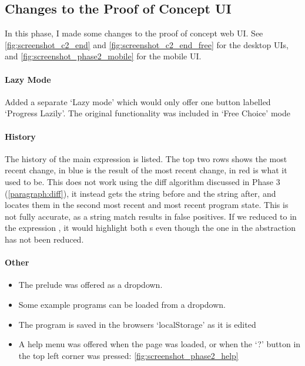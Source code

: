 \subsection{Changes to the Proof of Concept UI}
\label{c2_poc_ui_impl}
In this phase, I made some changes to the proof of concept web UI. See \ref{fig:screenshot_c2_end} and \ref{fig:screenshot_c2_end_free} for the desktop UIs, and \ref{fig:screenshot_phase2_mobile} for the mobile UI. 

\paragraph{Lazy Mode}
Added a separate `Lazy mode' which would only offer one button labelled `Progress Lazily'. The original functionality was included in `Free Choice' mode

\paragraph{History}
The history of the main expression is listed. The top two rows shows the most recent change, in blue is the result of the most recent change, in red is what it used to be. This does not work using the diff algorithm discussed in Phase 3 (\ref{paragraph:diff}), it instead gets the string before and the string after, and locates them in the second most recent and most recent program state. This is not fully accurate, as a string match results in false positives. If we reduced  to  in the expression , it would highlight both s even though the one in the abstraction has not been reduced. 

\paragraph{Other}

\begin{itemize}
    \item The prelude was offered as a dropdown.
    \item Some example programs can be loaded from a dropdown.  
    \item The program is saved in the browsers `localStorage' as it is edited
    \item A help menu was offered when the page was loaded, or when the `?' button in the top left corner was pressed: \ref{fig:screenshot_phase2_help}
\end{itemize}

